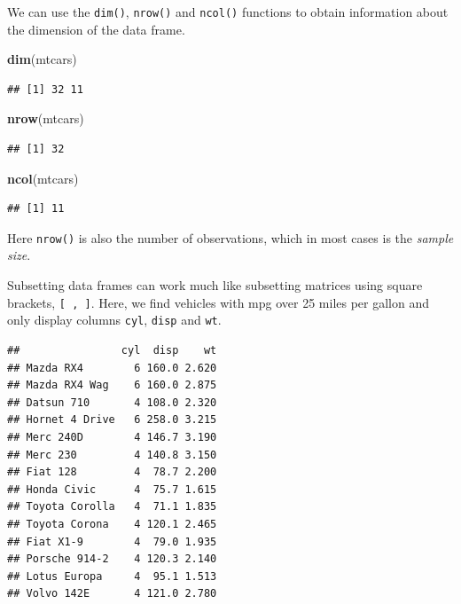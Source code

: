 \documentclass[]{book}
\newenvironment{Shaded}{\begin{snugshade}}{\end{snugshade}}
\newcommand{\KeywordTok}[1]{\textcolor[rgb]{0.13,0.29,0.53}{\textbf{#1}}}
\newcommand{\DecValTok}[1]{\textcolor[rgb]{0.00,0.00,0.81}{#1}}
\newcommand{\StringTok}[1]{\textcolor[rgb]{0.31,0.60,0.02}{#1}}
\newcommand{\CommentTok}[1]{\textcolor[rgb]{0.56,0.35,0.01}{\textit{#1}}}
\newcommand{\OperatorTok}[1]{\textcolor[rgb]{0.81,0.36,0.00}{\textbf{#1}}}
\newcommand{\NormalTok}[1]{#1}
\begin{document}
We can use the \texttt{dim()}, \texttt{nrow()} and \texttt{ncol()}
functions to obtain information about the dimension of the data frame.

\begin{Shaded}
\begin{Highlighting}[]
\KeywordTok{dim}\NormalTok{(mtcars)}
\end{Highlighting}
\end{Shaded}

\begin{verbatim}
## [1] 32 11
\end{verbatim}

\begin{Shaded}
\begin{Highlighting}[]
\KeywordTok{nrow}\NormalTok{(mtcars)}
\end{Highlighting}
\end{Shaded}

\begin{verbatim}
## [1] 32
\end{verbatim}

\begin{Shaded}
\begin{Highlighting}[]
\KeywordTok{ncol}\NormalTok{(mtcars)}
\end{Highlighting}
\end{Shaded}

\begin{verbatim}
## [1] 11
\end{verbatim}

Here \texttt{nrow()} is also the number of observations, which in most
cases is the \emph{sample size}.

Subsetting data frames can work much like subsetting matrices using
square brackets, \texttt{{[}\ ,\ {]}}. Here, we find vehicles with mpg
over 25 miles per gallon and only display columns \texttt{cyl},
\texttt{disp} and \texttt{wt}.

\begin{Shaded}
\end{Shaded}

\begin{verbatim}
##                cyl  disp    wt
## Mazda RX4        6 160.0 2.620
## Mazda RX4 Wag    6 160.0 2.875
## Datsun 710       4 108.0 2.320
## Hornet 4 Drive   6 258.0 3.215
## Merc 240D        4 146.7 3.190
## Merc 230         4 140.8 3.150
## Fiat 128         4  78.7 2.200
## Honda Civic      4  75.7 1.615
## Toyota Corolla   4  71.1 1.835
## Toyota Corona    4 120.1 2.465
## Fiat X1-9        4  79.0 1.935
## Porsche 914-2    4 120.3 2.140
## Lotus Europa     4  95.1 1.513
## Volvo 142E       4 121.0 2.780
\end{verbatim}
\end{document}
